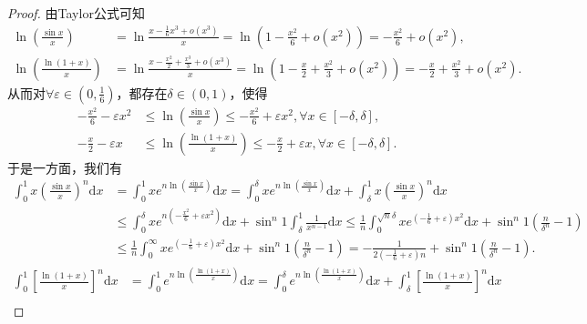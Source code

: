 \documentclass[../../main.tex]{subfiles}%
\begin{document}
\begin{proof}
由Taylor公式可知
\begin{align*}
\ln \left( \frac{\sin x}{x} \right) &=\ln \frac{x-\frac{1}{6}x^3+o\left( x^3 \right)}{x}=\ln \left( 1-\frac{x^2}{6}+o\left( x^2 \right) \right) =-\frac{x^2}{6}+o\left( x^2 \right) ,\\
\ln \left( \frac{\ln \left( 1+x \right)}{x} \right) &=\ln \frac{x-\frac{x^2}{2}+\frac{x^3}{3}+o\left( x^3 \right)}{x}=\ln \left( 1-\frac{x}{2}+\frac{x^2}{3}+o\left( x^2 \right) \right) =-\frac{x}{2}+\frac{x^2}{3}+o\left( x^2 \right) .
\end{align*}
从而对$\forall \varepsilon \in \left( 0,\frac{1}{6} \right)$，都存在$\delta \in (0,1)$，使得
\begin{align*}
-\frac{x^2}{6}-\varepsilon x^2&\leqslant \ln \left( \frac{\sin x}{x} \right) \leqslant -\frac{x^2}{6}+\varepsilon x^2,\forall x\in [-\delta ,\delta ] ,\\
-\frac{x}{2}-\varepsilon x&\leqslant \ln \left( \frac{\ln \left( 1+x \right)}{x} \right) \leqslant -\frac{x}{2}+\varepsilon x,\forall x\in [-\delta ,\delta ] .
\end{align*}
于是一方面，我们有
\begin{align*}
\int_0^1{x\left( \frac{\sin x}{x} \right) ^n\mathrm{d}x}&=\int_0^1{xe^{n\ln \left( \frac{\sin x}{x} \right)}\mathrm{d}x}=\int_0^{\delta}{xe^{n\ln \left( \frac{\sin x}{x} \right)}\mathrm{d}x}+\int_{\delta}^1{x\left( \frac{\sin x}{x} \right) ^n\mathrm{d}x}\\
&\leqslant \int_0^{\delta}{xe^{n\left( -\frac{x^2}{6}+\varepsilon x^2 \right)}\mathrm{d}x}+\sin ^n1\int_{\delta}^1{\frac{1}{x^{n-1}}\mathrm{d}x}\leqslant \frac{1}{n}\int_0^{\sqrt{n}\delta}{xe^{\left( -\frac{1}{6}+\varepsilon \right) x^2}\mathrm{d}x}+\sin ^n1\left( \frac{n}{\delta ^n}-1 \right)\\
&\leqslant \frac{1}{n}\int_0^{\infty}{xe^{\left( -\frac{1}{6}+\varepsilon \right) x^2}\mathrm{d}x}+\sin ^n1\left( \frac{n}{\delta ^n}-1 \right) =-\frac{1}{2\left( -\frac{1}{6}+\varepsilon \right) n}+\sin ^n1\left( \frac{n}{\delta ^n}-1 \right) .
\end{align*}
\begin{align*}
\int_0^1{\left[ \frac{\ln \left( 1+x \right)}{x} \right] ^n\mathrm{d}x}&=\int_0^1{e^{n\ln \left( \frac{\ln \left( 1+x \right)}{x} \right)}\mathrm{d}x}=\int_0^{\delta}{e^{n\ln \left( \frac{\ln \left( 1+x \right)}{x} \right)}\mathrm{d}x}+\int_{\delta}^1{\left[ \frac{\ln \left( 1+x \right)}{x} \right] ^n\mathrm{d}x}\\

\end{align*}
\end{proof}
\end{document}
